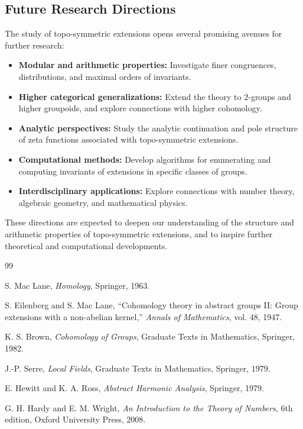 \documentclass[11pt,a4paper]{article}
\theoremstyle{plain}
\theoremstyle{definition}
\theoremstyle{remark}
\begin{document}
	\subsection{Future Research Directions}
	
	The study of topo-symmetric extensions opens several promising avenues for further research:
	
	\begin{itemize}
		\item \textbf{Modular and arithmetic properties:} Investigate finer congruences, distributions, and maximal orders of invariants.
		\item \textbf{Higher categorical generalizations:} Extend the theory to $2$-groups and higher groupoids, and explore connections with higher cohomology.
		\item \textbf{Analytic perspectives:} Study the analytic continuation and pole structure of zeta functions associated with topo-symmetric extensions.
		\item \textbf{Computational methods:} Develop algorithms for enumerating and computing invariants of extensions in specific classes of groups.
		\item \textbf{Interdisciplinary applications:} Explore connections with number theory, algebraic geometry, and mathematical physics.
	\end{itemize}
	
	These directions are expected to deepen our understanding of the structure and arithmetic properties of topo-symmetric extensions, and to inspire further theoretical and computational developments.
	
	
	\begin{thebibliography}{99}
		
		S. Mac Lane, \emph{Homology}, Springer, 1963.
		
		S. Eilenberg and S. Mac Lane, ``Cohomology theory in abstract groups II: Group extensions with a non-abelian kernel,'' \emph{Annals of Mathematics}, vol. 48, 1947.
		
		K. S. Brown, \emph{Cohomology of Groups}, Graduate Texts in Mathematics, Springer, 1982.
		
		J.-P. Serre, \emph{Local Fields}, Graduate Texts in Mathematics, Springer, 1979.
		
		E. Hewitt and K. A. Ross, \emph{Abstract Harmonic Analysis}, Springer, 1979.
		
		G. H. Hardy and E. M. Wright, \emph{An Introduction to the Theory of Numbers}, 6th edition, Oxford University Press, 2008.
		
	\end{thebibliography}
	
\end{document}
